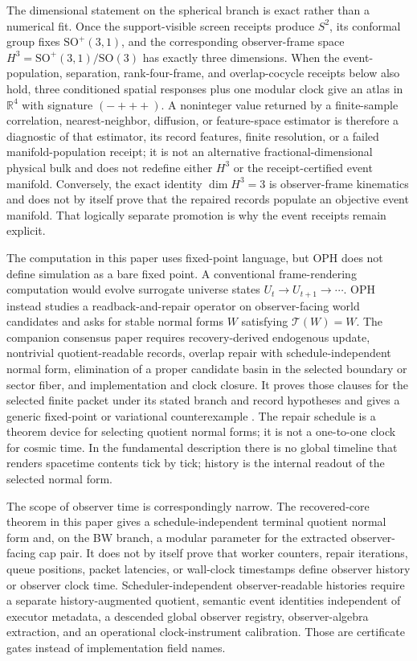 \documentclass[11pt]{article}
\begin{document}
The dimensional statement on the spherical branch is exact rather than a
numerical fit. Once the support-visible screen receipts produce \(S^2\), its
conformal group fixes \(\mathrm{SO}^{+}(3,1)\), and the corresponding
observer-frame space
\(H^3=\mathrm{SO}^{+}(3,1)/\mathrm{SO}(3)\) has exactly three dimensions.
When the event-population, separation, rank-four-frame, and overlap-cocycle
receipts below also hold, three conditioned spatial responses plus one modular
clock give an atlas in \(\mathbb R^4\) with signature
\((-{+}{+}{+})\). A noninteger value returned by a finite-sample correlation,
nearest-neighbor, diffusion, or feature-space estimator is therefore a
diagnostic of that estimator, its record features, finite resolution, or a
failed manifold-population receipt; it is not an alternative
fractional-dimensional physical bulk and does not redefine either \(H^3\) or
the receipt-certified event manifold. Conversely, the exact identity
\(\dim H^3=3\) is observer-frame kinematics and does not by itself prove that
the repaired records populate an objective event manifold. That logically
separate promotion is why the event receipts remain explicit.

The computation in this paper uses fixed-point language, but OPH does not define simulation as a
bare fixed point. A conventional frame-rendering computation would evolve surrogate universe states
\(U_t\to U_{t+1}\to\cdots\). OPH instead studies a readback-and-repair operator on
observer-facing world candidates and asks for stable normal forms \(W\) satisfying
\(\mathcal T(W)=W\). The companion consensus paper requires recovery-derived endogenous update,
nontrivial quotient-readable records, overlap repair with schedule-independent normal form,
elimination of a proper candidate basin in the selected boundary or sector fiber, and implementation
and clock closure. It proves those clauses for the selected finite packet under its stated branch
and record hypotheses and gives a generic fixed-point or variational counterexample
\cite{ophconsensus}. The repair schedule is a theorem device for selecting quotient normal forms;
it is not a one-to-one clock for cosmic time. In the fundamental description there is no global
timeline that renders spacetime contents tick by tick; history is the internal readout of the
selected normal form.

The scope of observer time is correspondingly narrow. The recovered-core theorem in this paper gives a
schedule-independent terminal quotient normal form and, on the BW branch, a modular parameter for
the extracted observer-facing cap pair. It does not by itself prove that worker counters, repair
iterations, queue positions, packet latencies, or wall-clock timestamps define observer history or
observer clock time. Scheduler-independent observer-readable histories require a separate
history-augmented quotient, semantic event identities independent of executor metadata, a descended
global observer registry, observer-algebra extraction, and an operational clock-instrument
calibration. Those are certificate gates instead of implementation field names.
\end{document}
